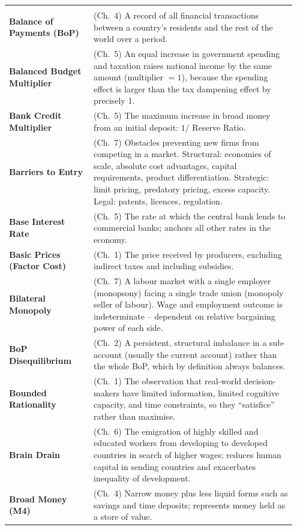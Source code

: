 \documentclass[11pt, a4paper, twoside]{book}
\begin{document}
\begin{longtable}{@{}>{\RaggedRight\arraybackslash}p{0.28\linewidth}>{\RaggedRight\arraybackslash}p{0.67\linewidth}@{}}
\multicolumn{2}{@{}l}{\textbf{\Large\color{CurveNavy} B}} \\[2pt]
\textbf{Balance of Payments (BoP)} & (Ch.~4) A record of all financial transactions between a country's residents and the rest of the world over a period. \\
\textbf{Balanced Budget Multiplier} & (Ch.~5) An equal increase in government spending and taxation raises national income by the same amount (multiplier $= 1$), because the spending effect is larger than the tax dampening effect by precisely 1. \\
\textbf{Bank Credit Multiplier} & (Ch.~5) The maximum increase in broad money from an initial deposit: $1 /$ Reserve Ratio. \\
\textbf{Barriers to Entry} & (Ch.~7) Obstacles preventing new firms from competing in a market. Structural: economies of scale, absolute cost advantages, capital requirements, product differentiation. Strategic: limit pricing, predatory pricing, excess capacity. Legal: patents, licences, regulation. \\
\textbf{Base Interest Rate} & (Ch.~5) The rate at which the central bank lends to commercial banks; anchors all other rates in the economy. \\
\textbf{Basic Prices (Factor Cost)} & (Ch.~1) The price received by producers, excluding indirect taxes and including subsidies. \\
\textbf{Bilateral Monopoly} & (Ch.~7) A labour market with a single employer (monopsony) facing a single trade union (monopoly seller of labour). Wage and employment outcome is indeterminate -- dependent on relative bargaining power of each side. \\
\textbf{BoP Disequilibrium} & (Ch.~2) A persistent, structural imbalance in a sub-account (usually the current account) rather than the whole BoP, which by definition always balances. \\
\textbf{Bounded Rationality} & (Ch.~1) The observation that real-world decision-makers have limited information, limited cognitive capacity, and time constraints, so they ``satisfice'' rather than maximise. \\
\textbf{Brain Drain} & (Ch.~6) The emigration of highly skilled and educated workers from developing to developed countries in search of higher wages; reduces human capital in sending countries and exacerbates inequality of development. \\
\textbf{Broad Money (M4)} & (Ch.~4) Narrow money plus less liquid forms such as savings and time deposits; represents money held as a store of value. \\

\end{longtable}
\end{document}
